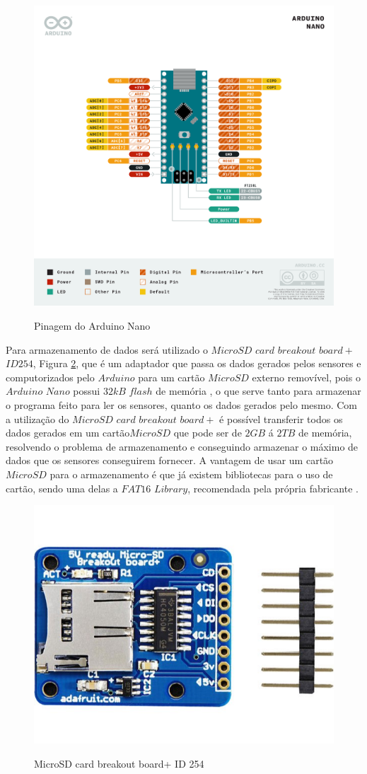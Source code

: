 \documentclass[acronym,symbols]{fei}
\begin{document}
\begin{figure}[!htb]
\centering
    \caption{Pinagem do Arduino Nano}
    \includegraphics[width=0.85\linewidth]{Imagens/Pinagem Arduino Nano.png}
    \label{fig:pinagem arduino}
\end{figure}

Para armazenamento de dados será utilizado o $MicroSD$ $card$ $breakout$ $board+$ $ID 254$, Figura \ref{fig:FotomicroSD}, que é um adaptador que passa os dados gerados pelos sensores e computorizados pelo $Arduino$ para um cartão $MicroSD$ externo removível, pois o $Arduino$ $Nano$ possui $32kB$ $flash$ de memória \cite{UNO}, o que serve tanto para armazenar o programa feito para ler os sensores, quanto os dados gerados pelo mesmo. Com a utilização do $MicroSD$ $card$ $breakout$ $board+$ é possível transferir todos os dados gerados em um cartão$ MicroSD$ que pode ser de $2GB$ á $2TB$ de memória, resolvendo o problema de armazenamento e conseguindo armazenar o máximo de dados que os sensores conseguirem fornecer. A vantagem de usar um cartão $MicroSD$ para o armazenamento é que já existem bibliotecas para o uso de cartão, sendo uma delas a $FAT16$ $Library$, recomendada pela própria fabricante \textcite{254MicroSD}.

\begin{figure}[!htb]
\centering
    \caption{MicroSD card breakout board+ ID 254}
    \includegraphics[width=0.45\linewidth]{Imagens/Adafruit 254 Micro SD.jpg}
    \label{fig:FotomicroSD}
\end{figure}
\end{document}
